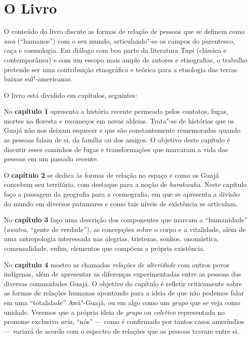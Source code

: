 \section{O Livro}

O conteúdo do livro discute as formas de relação de pessoas que se
definem como \emph{awa} (``humanos'') com o seu mundo, articulando"-se os
campos do parentesco, caça e cosmologia. Em diálogo com boa parte da
literatura Tupi (clássica e contemporânea) e com um escopo mais amplo de
autores e etnografias, o trabalho pretende ser uma contribuição
etnográfica e teórica para a etnologia das terras baixas sul"-americanas.

O livro está dividido em capítulos, seguintes:

No \textbf{capítulo 1} apresento a história recente permeada pelos
contatos, fugas, mortes na floresta e recomeços em novas aldeias.
Trata"-se de histórias que os Guajá não nos deixam esquecer e que são
constantemente rememoradas quando as pessoas falam de si, da família ou
dos amigos. O objetivo deste capítulo é discutir esses caminhos de fugas
e transformações que marcaram a vida das pessoas em um passado recente.

O \textbf{capítulo 2} se dedica às formas de relação no espaço e como os
Guajá concebem seu território, com destaque para a noção de
\emph{harakwaha}. Neste capítulo faço a passagem da geografia para a
cosmografia, em que se apresenta a divisão do mundo em diversos
patamares e como tais níveis de existência se articulam.

No \textbf{capítulo 3} faço uma descrição dos componentes que marcam a
``humanidade'' (\emph{awatea}, ``gente de verdade''), as concepções sobre
o corpo e a vitalidade, além de uma antropologia interessada nas
alegrias, tristezas, sonhos, onomástica, comensalidade, enfim, elementos
que compõem a própria existência.

No \textbf{capítulo 4} mostro as chamadas \emph{relações de alteridade}
com outros povos indígenas, além de apresentar as diferenças
experimentadas entre as pessoas das diversas comunidades Guajá. O
objetivo do capítulo é refletir criticamente sobre as formas de relações
humanas apontando para a ideia de que não podemos falar em uma
``totalidade'' Awá"-Guajá, ou em algo como um \emph{grupo} que se veja
como unidade. Veremos que a própria ideia de \emph{grupo} ou
\emph{coletivo} representada no pronome exclusivo \emph{aria}, ``nós'' ---
como é confirmado por tantos casos ameríndios --- variará de acordo com o
espectro de relações que as pessoas travam entre si.

